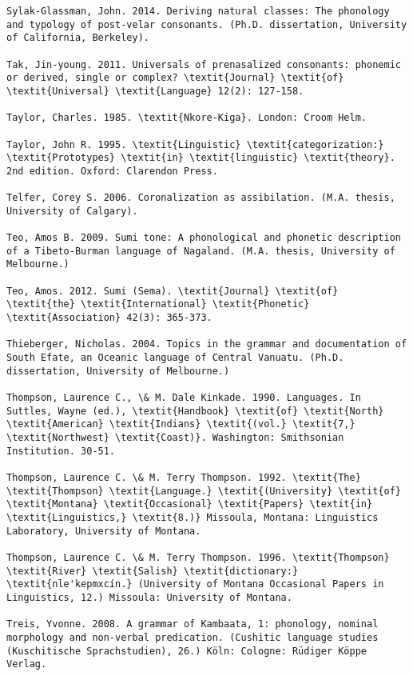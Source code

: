 \begin{verbatim}
Sylak-Glassman, John. 2014. Deriving natural classes: The phonology and typology of post-velar consonants. (Ph.D. dissertation, University of California, Berkeley).

Tak, Jin-young. 2011. Universals of prenasalized consonants: phonemic or derived, single or complex? \textit{Journal} \textit{of} \textit{Universal} \textit{Language} 12(2): 127-158.

Taylor, Charles. 1985. \textit{Nkore-Kiga}. London: Croom Helm.

Taylor, John R. 1995. \textit{Linguistic} \textit{categorization:} \textit{Prototypes} \textit{in} \textit{linguistic} \textit{theory}. 2nd edition. Oxford: Clarendon Press.

Telfer, Corey S. 2006. Coronalization as assibilation. (M.A. thesis, University of Calgary).

Teo, Amos B. 2009. Sumi tone: A phonological and phonetic description of a Tibeto-Burman language of Nagaland. (M.A. thesis, University of Melbourne.)

Teo, Amos. 2012. Sumi (Sema). \textit{Journal} \textit{of} \textit{the} \textit{International} \textit{Phonetic} \textit{Association} 42(3): 365-373.

Thieberger, Nicholas. 2004. Topics in the grammar and documentation of South Efate, an Oceanic language of Central Vanuatu. (Ph.D. dissertation, University of Melbourne.)

Thompson, Laurence C., \& M. Dale Kinkade. 1990. Languages. In Suttles, Wayne (ed.), \textit{Handbook} \textit{of} \textit{North} \textit{American} \textit{Indians} \textit{(vol.} \textit{7,} \textit{Northwest} \textit{Coast)}. Washington: Smithsonian Institution. 30-51.

Thompson, Laurence C. \& M. Terry Thompson. 1992. \textit{The} \textit{Thompson} \textit{Language.} \textit{(University} \textit{of} \textit{Montana} \textit{Occasional} \textit{Papers} \textit{in} \textit{Linguistics,} \textit{8.)} Missoula, Montana: Linguistics Laboratory, University of Montana.

Thompson, Laurence C. \& M. Terry Thompson. 1996. \textit{Thompson} \textit{River} \textit{Salish} \textit{dictionary:} \textit{nle'kepmxcín.} (University of Montana Occasional Papers in Linguistics, 12.) Missoula: University of Montana.

Treis, Yvonne. 2008. A grammar of Kambaata, 1: phonology, nominal morphology and non-verbal predication. (Cushitic language studies (Kuschitische Sprachstudien), 26.) Köln: Cologne: Rüdiger Köppe Verlag.


\end{verbatim}
